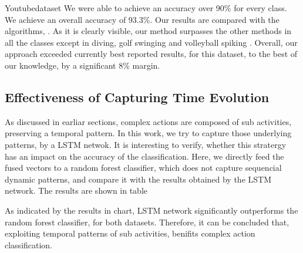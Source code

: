 Youtubedataset
We were able to achieve an accuracy over 90\% for every class. We achieve an overall accuracy of 93.3\%. Our results are compared with the
algorithms, . As it is clearly visible, our method surpasses the other
methods in all the classes except in diving, golf swinging
and volleyball spiking . Overall, our approach exceeded currently best reported results, for this dataset, to the best of our knowledge, 
by a significant 8\% margin.

\subsection{Effectiveness of Capturing Time Evolution}
As discussed in earliar sections, complex actions are composed of sub activities, preserving
a temporal pattern. In this work, we try to capture those underlying patterns, by a LSTM netwok.
It is interesting to verify, whether this stratergy has an impact on the accuracy of the 
classification. Here, we directly feed the fused vectors to a random forest classifier, which
does not capture sequencial dynamic patterns, and compare it with the results obtained by
the LSTM network. The results are shown in table

As indicated by the results in chart, LSTM network significantly outperforms the 
random forest classifier, for both datasets. Therefore, it can be concluded that, exploiting 
temporal patterns of sub activities, benifits complex action classification. 
